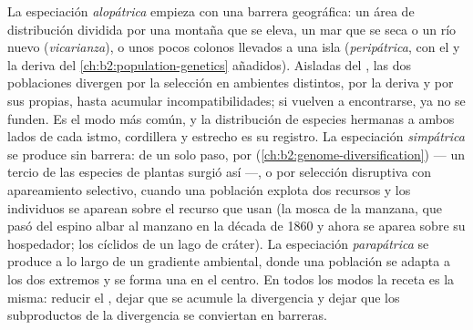 \begin{proposition}\label{prop:b2:speciation:modes}
La especiación \emph{alopátrica} empieza con una barrera geográfica:
un área de distribución dividida por una montaña que se eleva, un mar que
se seca o un río nuevo (\emph{vicarianza}), o unos pocos colonos llevados a
una isla (\emph{peripátrica}, con el  y la deriva del
\cref{ch:b2:population-genetics} añadidos). Aisladas del ,
las dos poblaciones divergen por la selección en ambientes distintos, por
la deriva y por sus  propias, hasta acumular
incompatibilidades; si vuelven a encontrarse, ya no se funden. Es el modo
más común, y la distribución de especies hermanas a ambos lados de cada
istmo, cordillera y estrecho es su registro. La especiación
\emph{simpátrica} se produce sin barrera: de un solo paso, por 
(\cref{ch:b2:genome-diversification}) --- un tercio de las especies de
plantas surgió así ---, o por selección disruptiva con apareamiento
selectivo, cuando una población explota dos recursos y los individuos se
aparean sobre el recurso que usan (la mosca de la manzana, que pasó del
espino albar al manzano en la década de 1860 y ahora se aparea sobre su
hospedador; los cíclidos de un lago de cráter). La especiación
\emph{parapátrica} se produce a lo largo de un gradiente ambiental, donde
una población se adapta a los dos extremos y se forma una  en
el centro. En todos los modos la receta es la misma: reducir el , dejar que se acumule la divergencia y dejar que los subproductos
de la divergencia se conviertan en barreras.
\end{proposition}

